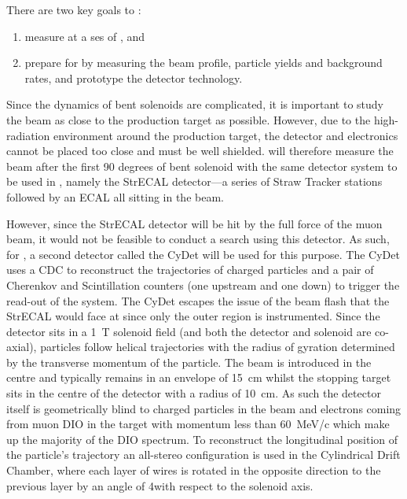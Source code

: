 There are two key goals to \phaseI:
\begin{enumerate}
	\item measure \mueconv at a \acf{ses} of \sensePI, and
\item prepare for \phaseII by measuring the beam profile, particle yields and background rates, and prototype the detector technology.
\end{enumerate}
Since the dynamics of bent solenoids are complicated, it is important to study the beam as close to the production target as possible.
However, due to the high-radiation environment around the production target, the detector and electronics cannot be placed too close and must be well shielded.
\phaseI will therefore measure the beam after the first 90 degrees of bent solenoid with the same detector system to be used in \phaseII, namely the \ac{StrECAL} detector---a series of Straw Tracker stations  followed by an ECAL
all sitting in the beam.  

However, since the StrECAL detector will be hit by the full force of the muon beam, it would not be feasible to conduct a \mueconv search using this detector.
As such, for \phaseI, a second detector called the \ac{CyDet} will be used for this purpose.
The \ac{CyDet} uses a \ac{CDC} to reconstruct the trajectories of charged particles and a pair of Cherenkov and Scintillation counters (one upstream and one down) to trigger the read-out of the system.
The \ac{CyDet} escapes the issue of the beam flash that the \ac{StrECAL} would face at \phaseI since only the outer region is instrumented.
Since the detector sits in a 1~T solenoid field (and both the detector and solenoid are co-axial), particles follow helical trajectories with the radius of gyration determined by the transverse momentum of the particle.
The beam is introduced in the centre and typically remains in an envelope of 15~cm whilst the stopping target sits in the centre of the detector with a radius of 10~cm.
As such the detector itself is geometrically blind to charged particles in the beam and electrons coming from muon \ac{DIO} in the target with momentum less than 60~MeV/c which make up the majority of the \ac{DIO} spectrum.
To reconstruct the longitudinal position of the particle's trajectory an all-stereo configuration is used in the Cylindrical Drift Chamber, where each layer of wires is rotated in the opposite direction to the previous layer by an angle of 4\degree with respect to the solenoid axis.


